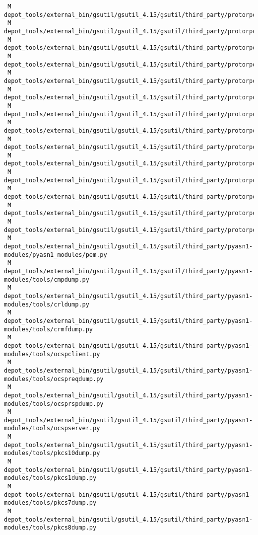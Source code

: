 \documentclass{article}
\begin{document}
\begin{verbatim}
 M depot_tools/external_bin/gsutil/gsutil_4.15/gsutil/third_party/protorpc/protorpc/registry.py
 M depot_tools/external_bin/gsutil/gsutil_4.15/gsutil/third_party/protorpc/protorpc/registry_test.py
 M depot_tools/external_bin/gsutil/gsutil_4.15/gsutil/third_party/protorpc/protorpc/remote.py
 M depot_tools/external_bin/gsutil/gsutil_4.15/gsutil/third_party/protorpc/protorpc/remote_test.py
 M depot_tools/external_bin/gsutil/gsutil_4.15/gsutil/third_party/protorpc/protorpc/test_util.py
 M depot_tools/external_bin/gsutil/gsutil_4.15/gsutil/third_party/protorpc/protorpc/transport.py
 M depot_tools/external_bin/gsutil/gsutil_4.15/gsutil/third_party/protorpc/protorpc/transport_test.py
 M depot_tools/external_bin/gsutil/gsutil_4.15/gsutil/third_party/protorpc/protorpc/util.py
 M depot_tools/external_bin/gsutil/gsutil_4.15/gsutil/third_party/protorpc/protorpc/util_test.py
 M depot_tools/external_bin/gsutil/gsutil_4.15/gsutil/third_party/protorpc/protorpc/webapp/forms_test.py
 M depot_tools/external_bin/gsutil/gsutil_4.15/gsutil/third_party/protorpc/protorpc/webapp/service_handlers_test.py
 M depot_tools/external_bin/gsutil/gsutil_4.15/gsutil/third_party/protorpc/protorpc/webapp_test_util.py
 M depot_tools/external_bin/gsutil/gsutil_4.15/gsutil/third_party/protorpc/protorpc/wsgi/service_test.py
 M depot_tools/external_bin/gsutil/gsutil_4.15/gsutil/third_party/protorpc/protorpc/wsgi/util_test.py
 M depot_tools/external_bin/gsutil/gsutil_4.15/gsutil/third_party/pyasn1-modules/pyasn1_modules/pem.py
 M depot_tools/external_bin/gsutil/gsutil_4.15/gsutil/third_party/pyasn1-modules/tools/cmpdump.py
 M depot_tools/external_bin/gsutil/gsutil_4.15/gsutil/third_party/pyasn1-modules/tools/crldump.py
 M depot_tools/external_bin/gsutil/gsutil_4.15/gsutil/third_party/pyasn1-modules/tools/crmfdump.py
 M depot_tools/external_bin/gsutil/gsutil_4.15/gsutil/third_party/pyasn1-modules/tools/ocspclient.py
 M depot_tools/external_bin/gsutil/gsutil_4.15/gsutil/third_party/pyasn1-modules/tools/ocspreqdump.py
 M depot_tools/external_bin/gsutil/gsutil_4.15/gsutil/third_party/pyasn1-modules/tools/ocsprspdump.py
 M depot_tools/external_bin/gsutil/gsutil_4.15/gsutil/third_party/pyasn1-modules/tools/ocspserver.py
 M depot_tools/external_bin/gsutil/gsutil_4.15/gsutil/third_party/pyasn1-modules/tools/pkcs10dump.py
 M depot_tools/external_bin/gsutil/gsutil_4.15/gsutil/third_party/pyasn1-modules/tools/pkcs1dump.py
 M depot_tools/external_bin/gsutil/gsutil_4.15/gsutil/third_party/pyasn1-modules/tools/pkcs7dump.py
 M depot_tools/external_bin/gsutil/gsutil_4.15/gsutil/third_party/pyasn1-modules/tools/pkcs8dump.py

\end{verbatim}
\end{document}
